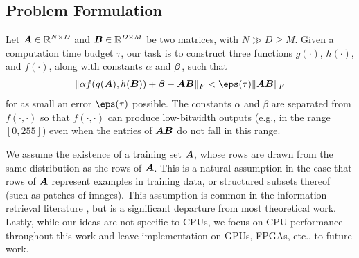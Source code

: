 \subsection{Problem Formulation} \label{sec:problemStatement}

Let $\bm{A} \in \mathbb{R}^{N \times D}$ and $\bm{B} \in \mathbb{R}^{D \times M}$ be two matrices, with $N \gg D \ge M$. Given a computation time budget $\tau$, our task is to
construct three functions $g(\cdot)$, $h(\cdot)$, and $f(\cdot)$, along with constants $\alpha$ and $\bm{\beta}$, such that
\begin{align} \label{eq:objective}
    \norm{\alpha f(g(\A), h(\B)) + \mat{\beta} - \A\B}_F < \eps(\tau) \norm{\A\B}_F
\end{align}
for as small an error $\eps(\tau)$ possible. The constants $\alpha$ and $\beta$ are separated from $f(\cdot,\cdot)$ so that $f(\cdot,\cdot)$ can produce low-bitwidth outputs (e.g., in the range $[0, 255]$) even when the entries of $\bm{A}\bm{B}$ do not fall in this range.

We assume the existence of a training set $\tilde{\bm{A}}$, whose rows are drawn from the same distribution as the rows of $\bm{A}$. This is a natural assumption in the case that rows of $\bm{A}$ represent examples in training data, or structured subsets thereof (such as patches of images). This assumption is common in the information retrieval literature \cite{bolt,pairq,quip}, but is a significant departure from most theoretical work. Lastly, while our ideas are not specific to CPUs, we focus on CPU performance throughout this work and leave implementation on GPUs, FPGAs, etc., to future work.


